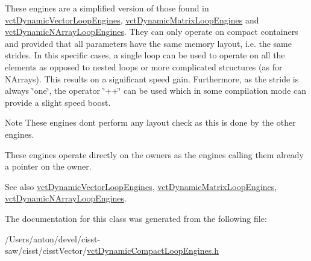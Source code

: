 These engines are a simplified version of those found in \hyperlink{classvct_dynamic_vector_loop_engines}{vct\+Dynamic\+Vector\+Loop\+Engines}, \hyperlink{classvct_dynamic_matrix_loop_engines}{vct\+Dynamic\+Matrix\+Loop\+Engines} and \hyperlink{classvct_dynamic_n_array_loop_engines}{vct\+Dynamic\+N\+Array\+Loop\+Engines}. They can only operate on compact containers and provided that all parameters have the same memory layout, i.\+e. the same strides. In this specific cases, a single loop can be used to operate on all the elements as opposed to nested loops or more complicated structures (as for N\+Arrays). This results on a significant speed gain. Furthermore, as the stride is always \char`\"{}one\char`\"{}, the operator \char`\"{}++\char`\"{} can be used which in some compilation mode can provide a slight speed boost.

\begin{DoxyNote}{Note}
These engines don\textquotesingle{}t perform any layout check as this is done by the other engines.

These engines operate directly on the owners as the engines calling them already a pointer on the owner.
\end{DoxyNote}
\begin{DoxySeeAlso}{See also}
\hyperlink{classvct_dynamic_vector_loop_engines}{vct\+Dynamic\+Vector\+Loop\+Engines}, \hyperlink{classvct_dynamic_matrix_loop_engines}{vct\+Dynamic\+Matrix\+Loop\+Engines}, \hyperlink{classvct_dynamic_n_array_loop_engines}{vct\+Dynamic\+N\+Array\+Loop\+Engines}. 
\end{DoxySeeAlso}


The documentation for this class was generated from the following file\+:\begin{DoxyCompactItemize}
\item 
/\+Users/anton/devel/cisst-\/saw/cisst/cisst\+Vector/\hyperlink{vct_dynamic_compact_loop_engines_8h}{vct\+Dynamic\+Compact\+Loop\+Engines.\+h}\end{DoxyCompactItemize}
